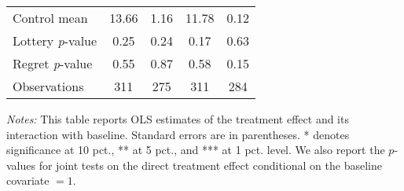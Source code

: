 \begin{table}[htbp]
{\begin{threeparttable}
\begin{tabular}{l*{4}{c}}
Control mean    &    13.66         &     1.16         &    11.78         &     0.12         \\
Lottery \emph{p}-value&     0.25         &     0.24         &     0.17         &     0.63         \\
Regret \emph{p}-value&     0.55         &     0.87         &     0.58         &     0.15         \\
Observations    &      311         &      275         &      311         &      284         \\
\bottomrule \end{tabular} \begin{tablenotes}[flushleft] \footnotesize \item \emph{Notes:} This table reports OLS estimates of the treatment effect and its interaction with baseline. Standard errors are in parentheses. * denotes significance at 10 pct., ** at 5 pct., and *** at 1 pct. level. We also report the \(p\)-values for joint tests on the direct treatment effect conditional on the baseline covariate $= 1$. \end{tablenotes} \end{threeparttable} } \end{table}
